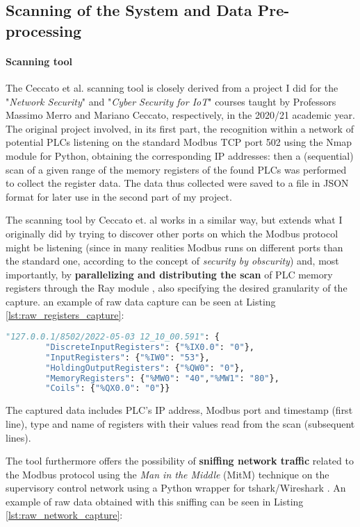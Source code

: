 \subsection{Scanning of the System and Data Pre-processing}
\label{subsec:ceccato_scan}
\paragraph{Scanning tool}
The Ceccato et al. scanning tool is closely derived from a project I did \cite{ns_proj} for the "\textit{Network Security}" and "\textit{Cyber Security for IoT}" courses taught by Professors Massimo Merro and Mariano Ceccato, respectively, in the 2020/21 academic year. The original project involved, in its first part, the recognition within a network of potential PLCs listening on the standard Modbus TCP port 502 using the Nmap module for Python, obtaining the corresponding IP addresses: then a (sequential) scan of a given range of the memory registers of the found PLCs was performed to collect the register data. The data thus collected were saved to a file in JSON format for later use in the second part of my project.

\bigskip
The scanning tool by Ceccato et. al works in a similar way, but extends what I originally did by trying to discover other ports on which the Modbus protocol might be listening (since in many realities Modbus runs on different ports than the standard one, according to the concept of \textit{security by obscurity}) and, most importantly, by \textbf{parallelizing and distributing the scan} of PLC memory registers through the Ray module \cite{ray}, also specifying the desired granularity of the capture. an example of raw data capture can be seen at Listing \ref{lst:raw_registers_capture}:

\bigskip
\begin{lstlisting}[language=Python, numbers=none, caption=Example of registers capture, label=lst:raw_registers_capture]	
	"127.0.0.1/8502/2022-05-03 12_10_00.591": {
		"DiscreteInputRegisters": {"%IX0.0": "0"},
		"InputRegisters": {"%IW0": "53"},
		"HoldingOutputRegisters": {"%QW0": "0"},
		"MemoryRegisters": {"%MW0": "40","%MW1": "80"},
		"Coils": {"%QX0.0": "0"}}
\end{lstlisting}

The captured data includes PLC's IP address, Modbus port and timestamp (first line), type and name of registers with their values read from the scan (subsequent lines).

\bigskip
The tool furthermore offers the possibility of \textbf{sniffing network traffic} related to the Modbus protocol using the \textit{Man in the Middle} (MitM) technique on the supervisory control network using a Python wrapper for tshark/Wireshark \cite{tshark} \cite{wireshark}. An example of raw data obtained with this sniffing can be seen in Listing \ref{lst:raw_network_capture}:

